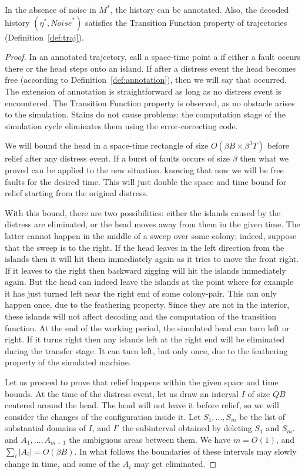 \documentclass[11pt]{memoir}
\theoremstyle{definition} %
\def\B{B}
\newcommand{\Noise}{\mathit{Noise}}
\newcommand{\Q}{Q} %
\newcommand{\Tu}{T}
\begin{document}
\begin{lemma}[Healing]\label{lem:healing}
In the absence of noise in \( M^{*} \), the history can be annotated.
Also, the decoded history \( (\eta^{*},\Noise^{*}) \) satisfies the Transition Function property 
of trajectories (Definition~\ref{def:traj}).
\end{lemma}
\begin{proof}
  In an annotated trajectory, call a space-time point a  if either a
  fault occurs there or the head steps onto an island.
  If after a distress event the head becomes free (according to Definition~\ref{def:annotation}),
  then we will say that  occurred.
The extension of annotation is straightforward as long as no distress event is encountered.
The Transition Function property is observed, as no obstacle arises to the simulation.
Stains do not cause problems: the computation stage of the simulation cycle eliminates them
using the error-correcting code.

We will bound the head in a space-time rectangle of size \( O(\beta\B\times\beta^{3}\Tu) \)
before relief after any distress event.
If a burst of faults occurs of size \( \beta \)
then what we proved can be applied to the new situation.
knowing that now we will be free faults for the desired time.
This will just double the space and time bound for relief starting from the original distress.

With this bound, there are two possibilities: either the islands caused by the distress are eliminated,
or the head moves away from them in the given time.
The latter cannot happen in the middle of a sweep over some colony;
indeed, suppose that the sweep is to the right.
If the head leaves in the left direction from the islands then it will hit them immediately again as it tries
to move the front right.
If it leaves to the right then backward zigging will hit the islands immediately again.
But the head can indeed leave the islands at the point where for example
it has just turned left near the right end of some colony-pair.
This can only happen once, due to the feathering property.
Since they are
not in the interior, these islands will not affect decoding and the computation of the transition function.
At the end of the working period, the simulated head can turn left or right.
If it turns right then any islands left at the right end will be eliminated during the transfer stage.
It can turn left, but only once, due to the feathering property of the simulated machine.

Let us proceed to prove that relief happens within the given space and time bounds.
At the time of the distress event, let us draw an interval \( I \) of size \( \Q\B \) centered 
around the head.
The head will not leave it before relief, so we will consider the changes of 
the configuration inside it.
Let \( S_{1},\dots,S_{m} \) be the list of substantial domains of \( I \), and \( I' \) the subinterval
obtained by deleting \( S_{1} \) and \( S_{m} \).
and \( A_{1},\dots,A_{m-1} \) the ambiguous areas between them.
We have  \( m=O(1) \), and \( \sum_{i}|A_{i}|=O(\beta\B) \).
In what follows the boundaries of these intervals may slowly change in time, and some of the \( A_{i} \)
may get eliminated.


\end{proof}
\end{document}
